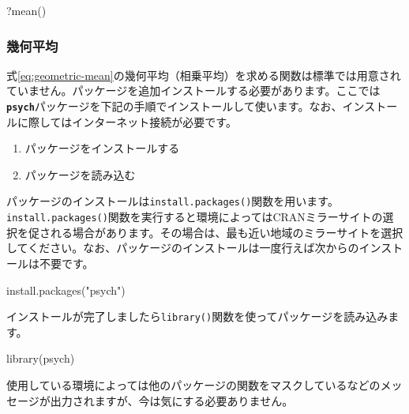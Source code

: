 \documentclass[
  12pt,
]{book}
\newenvironment{Shaded}{\begin{snugshade}}{\end{snugshade}}
\newcommand{\FunctionTok}[1]{\textcolor[rgb]{0.00,0.00,0.00}{#1}}
\newcommand{\NormalTok}[1]{#1}
\newcommand{\StringTok}[1]{\textcolor[rgb]{0.31,0.60,0.02}{#1}}
\providecommand{\tightlist}{%
  \setlength{\itemsep}{0pt}\setlength{\parskip}{0pt}}
\begin{document}
\begin{Shaded}
\begin{Highlighting}[numbers=left,,]
\NormalTok{?}\FunctionTok{mean}\NormalTok{()}
\end{Highlighting}
\end{Shaded}

\hypertarget{ux5e7eux4f55ux5e73ux5747}{%
\subsubsection{幾何平均}\label{ux5e7eux4f55ux5e73ux5747}}

式\eqref{eq:geometric-mean}の幾何平均（相乗平均）を求める関数は標準では用意されていません。パッケージを追加インストールする必要があります。ここでは\textbf{\texttt{psych}}パッケージを下記の手順でインストールして使います。なお、インストールに際してはインターネット接続が必要です。

\begin{enumerate}
\def\labelenumi{\arabic{enumi}.}
\tightlist
\item
  パッケージをインストールする
\item
  パッケージを読み込む
\end{enumerate}

パッケージのインストールは\texttt{install.packages()}関数を用います。\texttt{install.packages()}関数を実行すると環境によってはCRANミラーサイトの選択を促される場合があります。その場合は、最も近い地域のミラーサイトを選択してください。なお、パッケージのインストールは一度行えば次からのインストールは不要です。

\begin{Shaded}
\begin{Highlighting}[numbers=left,,]
\FunctionTok{install.packages}\NormalTok{(}\StringTok{"psych"}\NormalTok{)}
\end{Highlighting}
\end{Shaded}

インストールが完了しましたら\texttt{library()}関数を使ってパッケージを読み込みます。

\begin{Shaded}
\begin{Highlighting}[numbers=left,,]
\FunctionTok{library}\NormalTok{(psych)}
\end{Highlighting}
\end{Shaded}

使用している環境によっては他のパッケージの関数をマスクしているなどのメッセージが出力されますが、今は気にする必要ありません。
\end{document}

